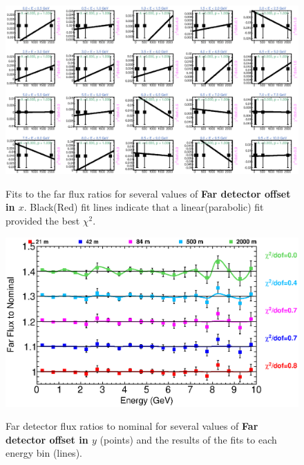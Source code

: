 {\begin{figure}[ht]
  \begin{center}
    {\includegraphics[width=5.0in]{figures/LBNEFDX_far_fits.eps}}
  \end{center}
\caption{ Fits to the far flux ratios for several values of {\bf Far detector offset in $x$}. Black(Red) fit lines indicate that a linear(parabolic) fit provided the best $\chi^2$. }
\end{figure}

\begin{figure}[ht]
  \begin{center}
    {\includegraphics[width=6.0in]{figures/LBNEFDY_far_summary.eps}}
  \end{center}
\caption{ Far detector flux ratios to nominal for several values of {\bf Far detector offset in $y$} (points) and the results of the fits to each energy bin (lines).}
\end{figure}

}
